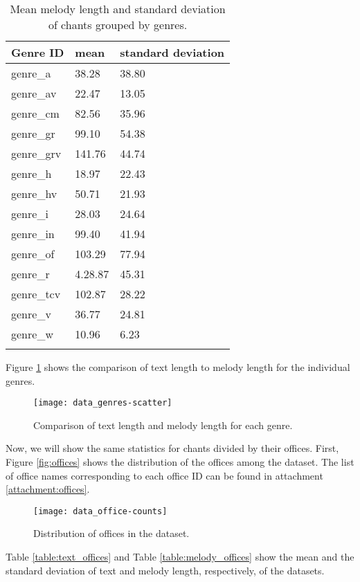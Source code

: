 \begin{longtable}{| p{} | p{} | p{} |}
\hline
Genre ID & mean & standard deviation \\
\hline
genre\_a & 38.28 & 38.80 \\
genre\_av & 22.47 & 13.05 \\
genre\_cm & 82.56 & 35.96 \\
genre\_gr & 99.10 & 54.38 \\
genre\_grv & 141.76 & 44.74 \\
genre\_h & 18.97 & 22.43 \\
genre\_hv & 50.71 & 21.93 \\
genre\_i & 28.03 & 24.64 \\
genre\_in & 99.40 & 41.94 \\
genre\_of & 103.29 & 77.94 \\
genre\_r & 4.28.87 & 45.31 \\
genre\_tcv & 102.87 & 28.22 \\
genre\_v & 36.77 & 24.81 \\
genre\_w & 10.96 & 6.23 \\
\hline

\caption{Mean melody length and standard deviation of chants grouped by genres.}
\label{table:melody_genres}
\end{longtable}

Figure \ref{fig:genres-scatter} shows the comparison of text length to melody length for the individual genres.

\begin{figure}[h!]
\centering
\texttt{[image: data\_genres-scatter]}
\caption{Comparison of text length and melody length for each genre.}
\label{fig:genres-scatter}
\end{figure}

Now, we will show the same statistics for chants divided by their offices. First, Figure \ref{fig:offices} shows the distribution of the offices
among the dataset. The list of office names corresponding to each office ID can be found in attachment \ref{attachment:offices}.

\begin{figure}[h!]
\centering
\texttt{[image: data\_office-counts]}
\caption{Distribution of offices in the dataset.}
\label{fig:office-counts}
\end{figure}

Table \ref{table:text_offices} and Table \ref{table:melody_offices} show the mean and the standard deviation of text and melody length, respectively,
of the datasets.

